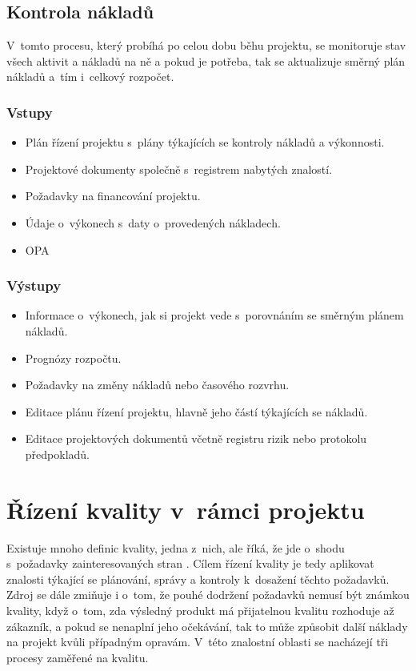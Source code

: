 \subsection*{Kontrola nákladů}

V~tomto procesu, který probíhá po celou dobu běhu projektu, se monitoruje stav všech aktivit a nákladů na ně a pokud je potřeba, tak se aktualizuje směrný plán nákladů a~tím i~celkový rozpočet.


\subsubsection*{Vstupy}
\begin{itemize}
    \item Plán řízení projektu s~plány týkajících se kontroly nákladů a výkonnosti.
    \item Projektové dokumenty společně s~registrem nabytých znalostí.
    \item Požadavky na financování projektu.
    \item Údaje o~výkonech s~daty o~provedených nákladech.
    \item OPA
\end{itemize}
\subsubsection*{Výstupy}
\begin{itemize}
    \item Informace o~výkonech, jak si projekt vede s~porovnáním se směrným plánem nákladů. 
    \item Prognózy rozpočtu.
    \item Požadavky na změny nákladů nebo časového rozvrhu.
    \item Editace plánu řízení projektu, hlavně jeho částí týkajících se nákladů.
    \item Editace projektových dokumentů včetně registru rizik nebo protokolu předpokladů.
\end{itemize}




\section{Řízení kvality v~rámci projektu}

Existuje mnoho definic kvality, jedna z~nich, ale říká, že jde o~shodu s~požadavky zainteresovaných stran \cite{StrategieRizeni}. Cílem řízení kvality je tedy aplikovat znalosti týkající se plánování, správy a kontroly k~dosažení těchto požadavků. Zdroj \cite{StrategieRizeni} se dále zmiňuje i o~tom, že pouhé dodržení požadavků nemusí být známkou kvality, když o~tom, zda výsledný produkt má přijatelnou kvalitu rozhoduje až zákazník, a pokud se nenaplní jeho očekávání, tak to může způsobit další náklady na projekt kvůli případným opravám. V~této znalostní oblasti se nacházejí tři procesy zaměřené na kvalitu.

